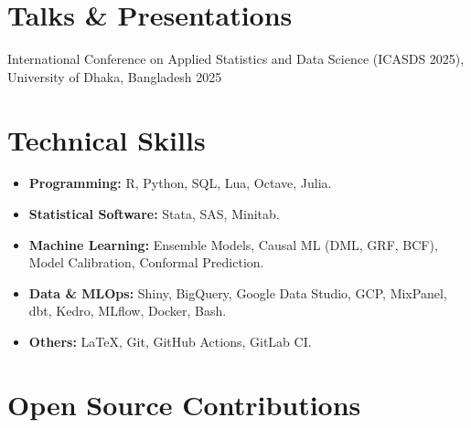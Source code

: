 \documentclass[letterpaper,11pt]{article}
\begin{document}
\ifcv
\section*{Talks \& Presentations}

\begin{itemize}
         {International Conference on Applied Statistics and Data Science
          (ICASDS 2025), University of Dhaka, Bangladesh}
         {2025}
\end{itemize}
\fi



\ifcv
\section*{Technical Skills}

\begin{itemize}[itemsep=3pt, parsep=0pt, topsep=0pt, leftmargin=*]

  \item \textbf{Programming:} R, Python, SQL, Lua, Octave, Julia.

  \item \textbf{Statistical Software:} Stata, SAS, Minitab.

  \item \textbf{Machine Learning:} Ensemble Models, Causal ML (DML, GRF, BCF),
        Model Calibration, Conformal Prediction.

  \item \textbf{Data \& MLOps:} Shiny, BigQuery, Google Data Studio, GCP,
        MixPanel, dbt, Kedro, MLflow, Docker, Bash.

  \item \textbf{Others:} \LaTeX{}, Git, GitHub Actions, GitLab CI.

\end{itemize}

\fi


\ifcv
\section*{Open Source Contributions}
\end{document}
